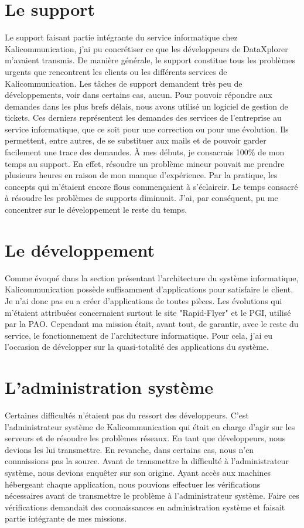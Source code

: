 
\section{Le support}
Le support faisant partie intégrante du service informatique chez Kalicommunication, j'ai pu concrétiser ce que les développeurs de DataXplorer m'avaient transmis. De manière générale, le support constitue tous les problèmes urgents que rencontrent les clients ou les différents services de Kalicommunication. Les tâches de support demandent très peu de développements, voir dans certains cas, aucun.\newline
Pour pouvoir répondre aux demandes dans les plus brefs délais, nous avons utilisé un logiciel de gestion de tickets. Ces derniers représentent les demandes des services de l'entreprise au service informatique, que ce soit pour une correction ou pour une évolution. Ils permettent, entre autres, de se substituer aux mails et de pouvoir garder facilement une trace des demandes.\newline
À mes débuts, je consacrais 100\% de mon temps au support. En effet, résoudre un problème mineur pouvait me prendre plusieurs heures en raison de mon manque d'expérience. Par la pratique, les concepts qui m'étaient encore flous commençaient à s'éclaircir. Le temps consacré à résoudre les problèmes de supports diminuait. J'ai, par conséquent, pu me concentrer sur le développement le reste du temps.

\section{Le développement}
Comme évoqué dans la section présentant l'architecture du système informatique, Kalicommunication possède suffisamment d'applications pour satisfaire le client. Je n'ai donc pas eu a créer d'applications de toutes pièces. Les évolutions qui m'étaient attribuées concernaient surtout le site "Rapid-Flyer" et le PGI, utilisé par la PAO. Cependant ma mission était, avant tout, de garantir, avec le reste du service, le fonctionnement de l'architecture informatique. Pour cela, j'ai eu l'occasion de développer sur la quasi-totalité des applications du système.

\section{L'administration système}
Certaines difficultés n'étaient pas du ressort des développeurs. C'est l'administrateur système de Kalicommunication qui était en charge d'agir sur les serveurs et de résoudre les problèmes réseaux. En tant que développeurs, nous devions les lui transmettre. En revanche, dans certains cas, nous n'en connaissions pas la source. Avant de transmettre la difficulté à l'administrateur système, nous devions enquêter sur son origine. Ayant accès aux machines hébergeant chaque application, nous pouvions effectuer les vérifications nécessaires avant de transmettre le problème à l'administrateur système.\newline
Faire ces vérifications demandait des connaissances en administration système et faisait partie intégrante de mes missions.